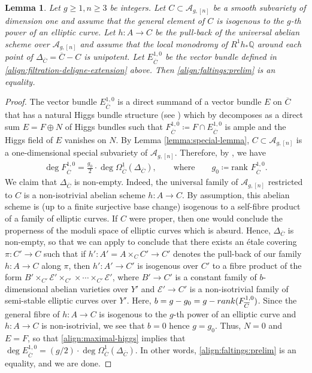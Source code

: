 \documentclass[a4paper,11pt,reqno]{amsart}
\numberwithin{equation}{section}
\theoremstyle{plain}
\newtheorem{lemma}[theorem]{Lemma}
\theoremstyle{definition}
\newcommand{\Q}{\mathbb Q}
\newcommand{\ol}[1]{{\overline{#1}}}
\let\rm\relax
\newcommand{\rm}[1]{{\mathrm{#1}}}
\newcommand{\ca}[1]{{\mathcal{#1}}}
\begin{document}
\begin{lemma} \label{lemma:arakelov-equality}
Let $g \geq 1, n \geq 3$ be integers. Let $C \subset \ca A_{g,[n]}$ be a smooth subvariety of dimension one and assume that the general element of $C$ is isogenous to the $g$-th power of an elliptic curve. Let $h \colon A \to C$ be the pull-back of the universal abelian scheme over $\ca A_{g,[n]}$ and assume that the local monodromy of $R^1h_\ast \Q$ around each point of $\Delta_{\ol C} = \ol C - C$ is unipotent. Let $E^{1,0}_{\ol C}$ be the vector bundle defined in \eqref{align:filtration-deligne-extension} above. Then \eqref{align:faltings:prelim} is an equality. 
\end{lemma}
\begin{proof}  
The vector bundle $E^{1,0}_{\ol C}$ is a direct summand of a vector bundle $E$ on $\ol C$ that has a natural Higgs bundle structure (see \cite{MR2074892,viehweg-zuo-characterization}) which by \cite{kollar-subadditivity} decomposes as a direct sum $E=F\oplus N$ of Higgs bundles such that $F^{1,0}_{\ol C} \coloneqq F \cap E^{1,0}_{\ol C}$ is ample and the Higgs field of $E$ vanishes on $N$. By Lemma \ref{lemma:special-lemma}, $C \subset \ca A_{g,[n]}$ is a one-dimensional special subvariety of $\ca A_{g,[n]}$. Therefore, by \cite{moller-shimura-teichmuller}, we have 
\begin{align} \label{align:maximal-higgs}
\deg F^{1,0}_{\ol C} = \frac{g_0}{2} \cdot \deg \Omega^1_{\ol C}(\Delta_{\ol C}), \quad \quad   \text{where}  \quad \quad g_0 \coloneqq \text{rank } F^{1,0}_{\ol C}. 
\end{align}
We claim that $\Delta_{\ol C}$ is non-empty. Indeed, the universal family of $\mathcal A_{g,[n]}$ restricted to $C$ is a non-isotrivial abelian scheme $h\colon A\to C$.
By assumption, this abelian scheme is (up to a finite surjective base change) isogenous to a self-fibre product of a family of elliptic curves.
If $C$ were proper, then one would conclude the properness of the moduli space of elliptic curves which is absurd. Hence, $\Delta_{\ol C}$ is non-empty, so that we can apply \cite[Theorem 0.2]{viehweg-zuo-characterization} to conclude that there exists an \'etale covering $\pi \colon C' \to C$ such that if $h' \colon A' = A \times_{C}C' \to C'$ denotes the pull-back of our family $h \colon A \to C$ along $\pi$, then $h' \colon A' \to C'$ is isogenous over $C'$ to a fibre product of the form $B' \times_{C'} \ca E' \times_{C'} \times \cdots \times_{C'} \ca E'$, where $B' \to C'$ is a constant family of $b$-dimensional abelian varieties over $Y'$ and $\ca E' \to C'$ is a non-isotrivial family of semi-stable elliptic curves over $Y'$. 
Here, $b = g-g_0 = g- \rm{rank}(F^{1,0}_{\ol C})$.  
Since the general fibre of $h \colon A \to C$ is isogenous to the $g$-th power of an elliptic curve and $h \colon A \to C$ is non-isotrivial, we see that $b = 0$ hence $g = g_0$. 
Thus, $N = 0$ and $E =F$, so that \eqref{align:maximal-higgs} implies  that $
\deg E^{1,0}_{\ol C} = (g/2) \cdot \deg \Omega^1_{\ol C}(\Delta_{\ol C})$.  
In other words, \eqref{align:faltings:prelim} is an equality, and we are done. 
\end{proof}
\end{document}
